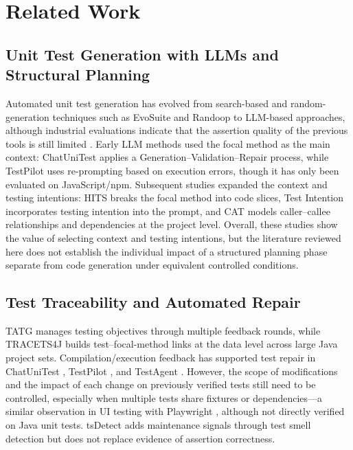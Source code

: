 \documentclass[pdflatex,sn-basic,Numbered,iicol]{sn-jnl}
\begin{document}
\section{Related Work}\label{sec:related-work}

\subsection{Unit Test Generation with LLMs and Structural Planning}\label{subsec:rw-generation}

Automated unit test generation has evolved from search-based and random-generation techniques such as EvoSuite \cite{bib1} and Randoop \cite{bib2} to LLM-based approaches, although industrial evaluations indicate that the assertion quality of the previous tools is still limited \cite{bib3}. Early LLM methods used the focal method as the main context: ChatUniTest \cite{bib4} applies a Generation--Validation--Repair process, while TestPilot \cite{bib5} uses re-prompting based on execution errors, though it has only been evaluated on JavaScript/npm. Subsequent studies expanded the context and testing intentions: HITS \cite{bib6} breaks the focal method into code slices, Test Intention \cite{bib7} incorporates testing intention into the prompt, and CAT \cite{bib8} models caller--callee relationships and dependencies at the project level. Overall, these studies show the value of selecting context and testing intentions, but the literature reviewed here does not establish the individual impact of a structured planning phase separate from code generation under equivalent controlled conditions.

\subsection{Test Traceability and Automated Repair}\label{subsec:rw-traceability}

TATG \cite{bib9} manages testing objectives through multiple feedback rounds, while TRACETS4J \cite{bib10} builds test--focal-method links at the data level across large Java project sets. Compilation/execution feedback has supported test repair in ChatUniTest \cite{bib4}, TestPilot \cite{bib5}, and TestAgent \cite{bib23}. However, the scope of modifications and the impact of each change on previously verified tests still need to be controlled, especially when multiple tests share fixtures or dependencies---a similar observation in UI testing with Playwright \cite{bib24}, although not directly verified on Java unit tests. tsDetect \cite{bib25} adds maintenance signals through test smell detection but does not replace evidence of assertion correctness.
\end{document}

